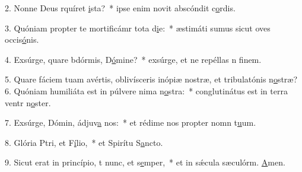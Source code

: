 2. Nonne Deus rquíret \uline{i}sta?~* ipse enim novit abscóndit c\uline{o}rdis.\par 
3. Quóniam propter te mortificámr tota d\uline{i}e:~* æstimáti sumus sicut oves occis\uline{ó}nis.\par 
4. Exsúrge, quare bdórmis, D\uline{ó}mine?~* exsúrge, et ne repéllas n f\uline{i}nem.\par 
5. Quare fáciem tuam avértis, oblivísceris inópiæ nostræ, et tribulatónis n\uline{o}stræ?
6. Quóniam humiliáta est in púlvere nima n\uline{o}stra:~* conglutinátus est in terra ventr n\uline{o}ster.\par 
7. Exsúrge, Dómin, ádjuv\uline{a} nos:~* et rédime nos propter nomn t\uline{u}um.\par 
8. Glória Ptri, et F\uline{í}lio,~* et Spirítu S\uline{a}ncto.\par 
9. Sicut erat in princípio, t nunc, et s\uline{e}mper,~* et in sǽcula sæculórm. \uline{A}men.\par 

